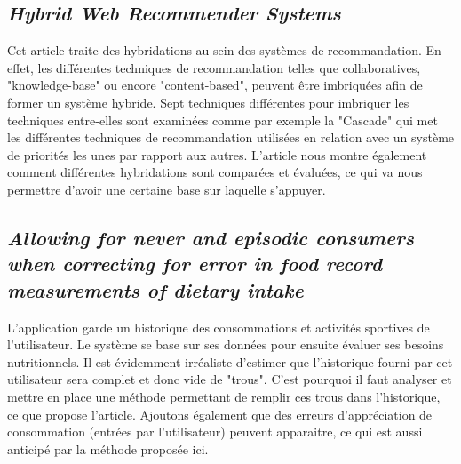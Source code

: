 \documentclass[a4paper, 11pt]{article}
\begin{document}
\subsection{\textit{Hybrid Web Recommender Systems} \cite{hybrid}}

Cet article traite des hybridations au sein des systèmes de recommandation. En effet, les différentes techniques de recommandation telles que collaboratives, "knowledge-base" ou encore "content-based", peuvent être imbriquées afin de former un système hybride. Sept techniques différentes pour imbriquer les techniques entre-elles sont examinées comme par exemple la "Cascade" qui met les différentes techniques de recommandation utilisées en relation avec un système de priorités les unes par rapport aux autres. L'article nous montre également comment différentes hybridations sont comparées et évaluées, ce qui va nous permettre d'avoir une certaine base sur laquelle s'appuyer.

\subsection{\textit{Allowing for never and episodic consumers when correcting for error in food record measurements of dietary intake} \cite{trou}}
L'application garde un historique des consommations et activités sportives de l'utilisateur. Le système se base sur ses données pour ensuite évaluer ses besoins nutritionnels. Il est évidemment irréaliste d'estimer que l'historique fourni par cet utilisateur sera complet et donc vide de "trous". C'est pourquoi il faut analyser et mettre en place une méthode permettant de remplir ces trous dans l'historique, ce que propose l'article. Ajoutons également que des erreurs d'appréciation de consommation (entrées par l'utilisateur) peuvent apparaitre, ce qui est aussi anticipé par la méthode proposée ici.  
\end{document}
